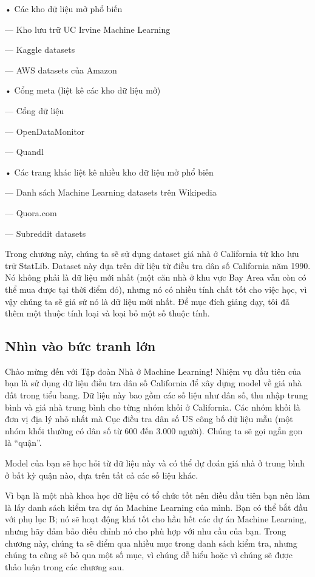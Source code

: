 • Các kho dữ liệu mở phổ biến

— Kho lưu trữ UC Irvine Machine Learning

— Kaggle datasets

— AWS datasets của Amazon

• Cổng meta (liệt kê các kho dữ liệu mở)

— Cổng dữ liệu

— OpenDataMonitor

— Quandl

• Các trang khác liệt kê nhiều kho dữ liệu mở phổ biến

— Danh sách Machine Learning datasets trên Wikipedia

— Quora.com

— Subreddit datasets

Trong chương này, chúng ta sẽ sử dụng dataset giá nhà ở California từ kho lưu trữ StatLib. Dataset này dựa trên dữ liệu từ điều tra dân số California năm 1990. Nó không phải là dữ liệu mới nhất (một căn nhà ở khu vực Bay Area vẫn còn có thể mua được tại thời điểm đó), nhưng nó có nhiều tính chất tốt cho việc học, vì vậy chúng ta sẽ giả sử nó là dữ liệu mới nhất. Để mục đích giảng dạy, tôi đã thêm một thuộc tính loại và loại bỏ một số thuộc tính.

\subsection{Nhìn vào bức tranh lớn}

Chào mừng đến với Tập đoàn Nhà ở Machine Learning! Nhiệm vụ đầu tiên của bạn là sử dụng dữ liệu điều tra dân số California để xây dựng model về giá nhà đất trong tiểu bang. Dữ liệu này bao gồm các số liệu như dân số, thu nhập trung bình và giá nhà trung bình cho từng nhóm khối ở California. Các nhóm khối là đơn vị địa lý nhỏ nhất mà Cục điều tra dân số US công bố dữ liệu mẫu (một nhóm khối thường có dân số từ 600 đến 3.000 người). Chúng ta sẽ gọi ngắn gọn là “quận”.

Model của bạn sẽ học hỏi từ dữ liệu này và có thể dự đoán giá nhà ở trung bình ở bất kỳ quận nào, dựa trên tất cả các số liệu khác.

Vì bạn là một nhà khoa học dữ liệu có tổ chức tốt nên điều đầu tiên bạn nên làm là lấy danh sách kiểm tra dự án Machine Learning của mình. Bạn có thể bắt đầu với phụ lục B; nó sẽ hoạt động khá tốt cho hầu hết các dự án Machine Learning, nhưng hãy đảm bảo điều chỉnh nó cho phù hợp với nhu cầu của bạn. Trong chương này, chúng ta sẽ điểm qua nhiều mục trong danh sách kiểm tra, nhưng chúng ta cũng sẽ bỏ qua một số mục, vì chúng dễ hiểu hoặc vì chúng sẽ được thảo luận trong các chương sau.

